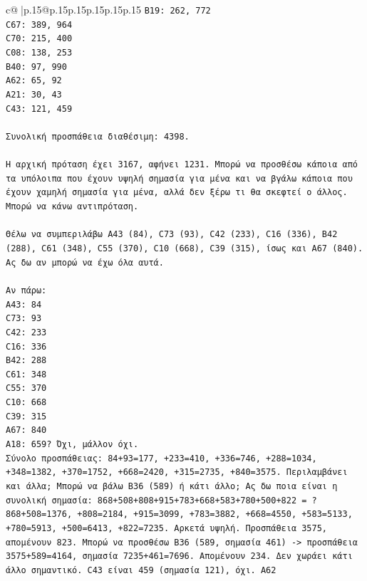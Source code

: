 \documentclass{article}
\begin{document}
{\begin{supertabular}{c@{$\;$}|p{.15\linewidth}@{}p{.15\linewidth}p{.15\linewidth}p{.15\linewidth}p{.15\linewidth}p{.15\linewidth}}
{{{\texttt{B19: 262, 772} \\
\texttt{C67: 389, 964} \\
\texttt{C70: 215, 400} \\
\texttt{C08: 138, 253} \\
\texttt{B40: 97, 990} \\
\texttt{A62: 65, 92} \\
\texttt{A21: 30, 43} \\
\texttt{C43: 121, 459} \\
\\ 
\texttt{Συνολική προσπάθεια διαθέσιμη: 4398.} \\
\\ 
\texttt{Η αρχική πρόταση έχει 3167, αφήνει 1231. Μπορώ να προσθέσω κάποια από τα υπόλοιπα που έχουν υψηλή σημασία για μένα και να βγάλω κάποια που έχουν χαμηλή σημασία για μένα, αλλά δεν ξέρω τι θα σκεφτεί ο άλλος. Μπορώ να κάνω αντιπρόταση.} \\
\\ 
\texttt{Θέλω να συμπεριλάβω A43 (84), C73 (93), C42 (233), C16 (336), B42 (288), C61 (348), C55 (370), C10 (668), C39 (315), ίσως και A67 (840). Ας δω αν μπορώ να έχω όλα αυτά.} \\
\\ 
\texttt{Αν πάρω:} \\
\texttt{A43: 84} \\
\texttt{C73: 93} \\
\texttt{C42: 233} \\
\texttt{C16: 336} \\
\texttt{B42: 288} \\
\texttt{C61: 348} \\
\texttt{C55: 370} \\
\texttt{C10: 668} \\
\texttt{C39: 315} \\
\texttt{A67: 840} \\
\texttt{A18: 659? Όχι, μάλλον όχι.} \\
\texttt{Σύνολο προσπάθειας: 84+93=177, +233=410, +336=746, +288=1034, +348=1382, +370=1752, +668=2420, +315=2735, +840=3575. Περιλαμβάνει και άλλα; Μπορώ να βάλω B36 (589) ή κάτι άλλο; Ας δω ποια είναι η συνολική σημασία: 868+508+808+915+783+668+583+780+500+822 = ? 868+508=1376, +808=2184, +915=3099, +783=3882, +668=4550, +583=5133, +780=5913, +500=6413, +822=7235. Αρκετά υψηλή. Προσπάθεια 3575, απομένουν 823. Μπορώ να προσθέσω B36 (589, σημασία 461) {-}> προσπάθεια 3575+589=4164, σημασία 7235+461=7696. Απομένουν 234. Δεν χωράει κάτι άλλο σημαντικό. C43 είναι 459 (σημασία 121), όχι. A62} \\
            }
        }
    }
     \\ \\


\end{supertabular}}
\end{document}
